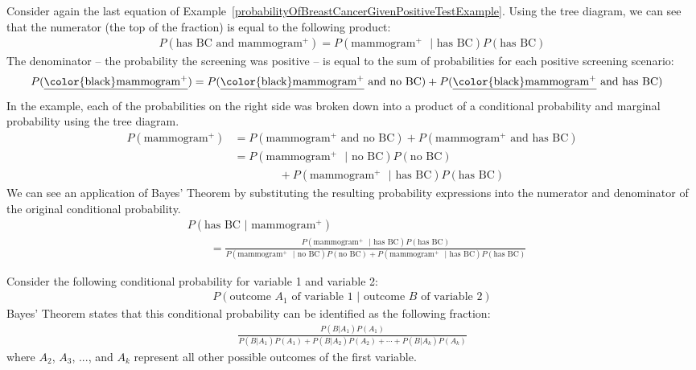 Consider again the last equation of Example~\ref{probabilityOfBreastCancerGivenPositiveTestExample}.
Using the tree diagram, we can see that the numerator (the top of the fraction) is equal to the following product:
\begin{align*}
P(\text{has BC and mammogram$^+$}) = P(\text{mammogram$^+$ } | \text{ has BC})P(\text{has BC})
\end{align*}
The denominator -- the probability the screening was positive -- is equal to the sum of probabilities for each positive screening scenario:
\begin{align*}
P(\text{\underline{\color{black}mammogram$^+$}})
	&= P(\text{\underline{\color{black}mammogram$^+$} and no BC})
		+ P(\text{\underline{\color{black}mammogram$^+$} and has BC})
\end{align*}
In the example, each of the probabilities on the right side was broken down into a product of a conditional probability and marginal probability using the tree diagram.
\begin{align*}
P(\text{mammogram$^+$})
	&= P(\text{mammogram$^+$ and no BC}) + P(\text{mammogram$^+$ and has BC}) \\
	&= P(\text{mammogram$^+$ } | \text{ no BC})P(\text{no BC}) \\
			   &\qquad\qquad + P(\text{mammogram$^+$ } | \text{ has BC})P(\text{has BC})
\end{align*}
We can see an application of Bayes' Theorem by substituting the resulting probability expressions into the numerator and denominator of the original conditional probability.
\begin{align*}
& P(\text{has BC } | \text{ mammogram$^+$})  \\
& \qquad= \frac{P(\text{mammogram$^+$ } | \text{ has BC})P(\text{has BC})}
	{P(\text{mammogram$^+$ } | \text{ no BC})P(\text{no BC}) + P(\text{mammogram$^+$ } | \text{ has BC})P(\text{has BC})}
\end{align*}

\begin{termBox}{
Consider the following conditional probability for variable 1 and variable 2:\vspace{-1.5mm}
\begin{align*}
P(\text{outcome $A_1$ of variable 1 } | \text{ outcome $B$ of variable 2})
\end{align*}
Bayes' Theorem states that this conditional probability can be identified as the following fraction:\vspace{-1.5mm}
\begin{align}
\frac{P(B | A_1) P(A_1)}
	{P(B | A_1) P(A_1) + P(B | A_2) P(A_2) + \cdots + P(B | A_k) P(A_k)}
	\label{equationOfBayesTheorem}
\end{align}
where $A_2$, $A_3$, ..., and $A_k$ represent all other possible outcomes of the first variable.}
\end{termBox}

